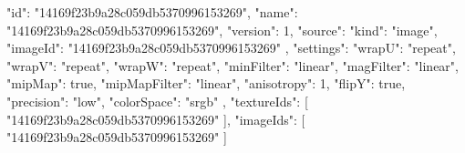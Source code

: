 {
  "id": "14169f23b9a28c059db5370996153269",
  "name": "14169f23b9a28c059db5370996153269",
  "version": 1,
  "source": {
    "kind": "image",
    "imageId": "14169f23b9a28c059db5370996153269"
  },
  "settings": {
    "wrapU": "repeat",
    "wrapV": "repeat",
    "wrapW": "repeat",
    "minFilter": "linear",
    "magFilter": "linear",
    "mipMap": true,
    "mipMapFilter": "linear",
    "anisotropy": 1,
    "flipY": true,
    "precision": "low",
    "colorSpace": "srgb"
  },
  "textureIds": [
    "14169f23b9a28c059db5370996153269"
  ],
  "imageIds": [
    "14169f23b9a28c059db5370996153269"
  ]
}
